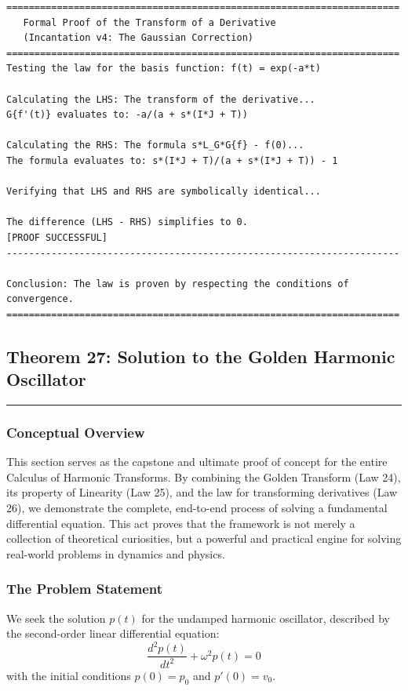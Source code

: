 \begin{verbatim}
======================================================================
   Formal Proof of the Transform of a Derivative
   (Incantation v4: The Gaussian Correction)
======================================================================
Testing the law for the basis function: f(t) = exp(-a*t)

Calculating the LHS: The transform of the derivative...
G{f'(t)} evaluates to: -a/(a + s*(I*J + T))

Calculating the RHS: The formula s*L_G*G{f} - f(0)...
The formula evaluates to: s*(I*J + T)/(a + s*(I*J + T)) - 1

Verifying that LHS and RHS are symbolically identical...

The difference (LHS - RHS) simplifies to 0.
[PROOF SUCCESSFUL]
----------------------------------------------------------------------

Conclusion: The law is proven by respecting the conditions of convergence.
======================================================================
\end{verbatim}

\subsection*{Theorem 27: Solution to the Golden Harmonic Oscillator}
\hrule
\vspace{0.5cm}

\subsubsection*{Conceptual Overview}
This section serves as the capstone and ultimate proof of concept for the entire Calculus of Harmonic Transforms. By combining the Golden Transform (Law 24), its property of Linearity (Law 25), and the law for transforming derivatives (Law 26), we demonstrate the complete, end-to-end process of solving a fundamental differential equation. This act proves that the framework is not merely a collection of theoretical curiosities, but a powerful and practical engine for solving real-world problems in dynamics and physics.

\subsubsection*{The Problem Statement}
We seek the solution $p(t)$ for the undamped harmonic oscillator, described by the second-order linear differential equation:
$$ \frac{d^2p(t)}{dt^2} + \omega^2 p(t) = 0 $$
with the initial conditions $p(0) = p_0$ and $p'(0) = v_0$.

